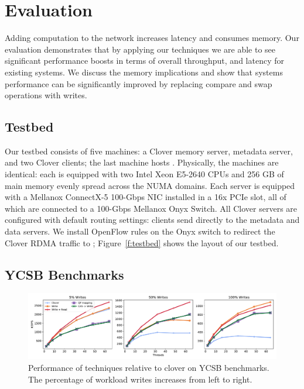 \section{Evaluation}
\label{s:results}

Adding computation to the network increases latency and consumes memory. Our
evaluation demonstrates that by applying our techniques we are able to see
significant performance boosts in terms of overall throughput, and latency for
existing systems. We discuss the memory implications and show that systems
performance can be significantly improved by replacing compare and swap
operations with writes.

\subsection{Testbed}

Our testbed consists of five machines: a Clover memory server, metadata server,
and two Clover clients; the last machine hosts {\sword}. Physically, the
machines are identical: each is equipped with two Intel Xeon E5-2640 CPUs and
256 GB of main memory evenly spread across the NUMA domains. Each server is
equipped with a Mellanox ConnectX-5 100-Gbps NIC installed in a 16x PCIe slot,
all of which are connected to a 100-Gbps Mellanox Onyx Switch. All Clover
servers are configured with default routing settings: clients send directly to
the metadata and data servers. We install OpenFlow rules on the Onyx switch to
redirect the Clover RDMA traffic to \sword; \textbf{}
Figure~\ref{f:testbed} shows the layout of our testbed.

\subsection{YCSB Benchmarks}

\begin{figure}
    \includegraphics[width=1.0\textwidth]{fig/full_system_performance.pdf}

    \caption{{Performance of \sword techniques relative to clover on YCSB
    benchmarks. The percentage of workload writes increases from left to
    right.}}

    \label{fig:full_system_performance}
\end{figure}

